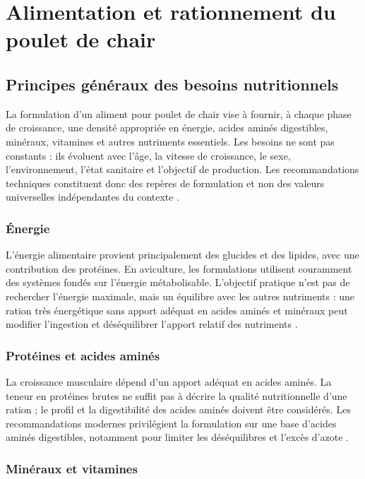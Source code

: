 \section{Alimentation et rationnement du poulet de chair}

\subsection{Principes généraux des besoins nutritionnels}

La formulation d'un aliment pour poulet de chair vise à fournir, à chaque phase de croissance, une densité appropriée en énergie, acides aminés digestibles, minéraux, vitamines et autres nutriments essentiels. Les besoins ne sont pas constants : ils évoluent avec l'âge, la vitesse de croissance, le sexe, l'environnement, l'état sanitaire et l'objectif de production. Les recommandations techniques constituent donc des repères de formulation et non des valeurs universelles indépendantes du contexte \citep{RavindranAbdollahi2021,Aviagen2022}.

\subsubsection{Énergie}

L'énergie alimentaire provient principalement des glucides et des lipides, avec une contribution des protéines. En aviculture, les formulations utilisent couramment des systèmes fondés sur l'énergie métabolisable. L'objectif pratique n'est pas de rechercher l'énergie maximale, mais un équilibre avec les autres nutriments : une ration très énergétique sans apport adéquat en acides aminés et minéraux peut modifier l'ingestion et déséquilibrer l'apport relatif des nutriments \citep{Aviagen2022,RavindranAbdollahi2021}.

\subsubsection{Protéines et acides aminés}

La croissance musculaire dépend d'un apport adéquat en acides aminés. La teneur en protéines brutes ne suffit pas à décrire la qualité nutritionnelle d'une ration ; le profil et la digestibilité des acides aminés doivent être considérés. Les recommandations modernes privilégient la formulation sur une base d'acides aminés digestibles, notamment pour limiter les déséquilibres et l'excès d'azote \citep{Aviagen2022}.

\subsubsection{Minéraux et vitamines}

